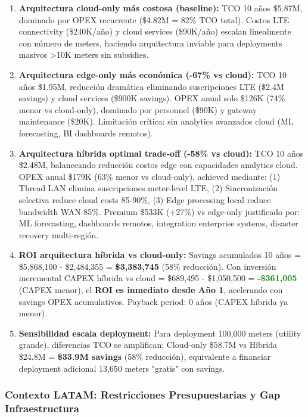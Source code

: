 \begin{enumerate}
\item \textbf{Arquitectura cloud-only más costosa (baseline):} TCO 10 años \$5.87M, dominado por OPEX recurrente (\$4.82M = 82\% TCO total). Costos LTE connectivity (\$240K/año) y cloud services (\$90K/año) escalan linealmente con número de meters, haciendo arquitectura inviable para deployments masivos >10K meters sin subsidies.

\item \textbf{Arquitectura edge-only más económica (-67\% vs cloud):} TCO 10 años \$1.95M, reducción dramática eliminando suscripciones LTE (\$2.4M savings) y cloud services (\$900K savings). OPEX anual solo \$126K (74\% menor vs cloud-only), dominado por personnel (\$90K) y gateway maintenance (\$20K). Limitación crítica: sin analytics avanzados cloud (ML forecasting, BI dashboards remotos).

\item \textbf{Arquitectura híbrida optimal trade-off (-58\% vs cloud):} TCO 10 años \$2.48M, balanceando reducción costos edge con capacidades analytics cloud. OPEX anual \$179K (63\% menor vs cloud-only), achieved mediante: (1) Thread LAN elimina suscripciones meter-level LTE, (2) Sincronización selectiva reduce cloud costs 85-90\%, (3) Edge processing local reduce bandwidth WAN 85\%. Premium \$533K (+27\%) vs edge-only justificado por: ML forecasting, dashboards remotos, integration enterprise systems, disaster recovery multi-región.

\item \textbf{ROI arquitectura híbrida vs cloud-only:} Savings acumulados 10 años = \$5,868,100 - \$2,484,355 = \textbf{\$3,383,745} (58\% reducción). Con inversión incremental CAPEX híbrida vs cloud = \$689,495 - \$1,050,500 = \textcolor{green}{\textbf{-\$361,005}} (CAPEX menor), el \textbf{ROI es inmediato desde Año 1}, acelerando con savings OPEX acumulativos. Payback period: 0 años (CAPEX híbrida ya menor).

\item \textbf{Sensibilidad escala deployment:} Para deployment 100,000 meters (utility grande), diferencias TCO se amplifican: Cloud-only \$58.7M vs Híbrida \$24.8M = \textbf{\$33.9M savings} (58\% reducción), equivalente a financiar deployment adicional 13,650 meters "gratis" con savings.
\end{enumerate}

\subsubsection{Contexto LATAM: Restricciones Presupuestarias y Gap Infraestructura}

